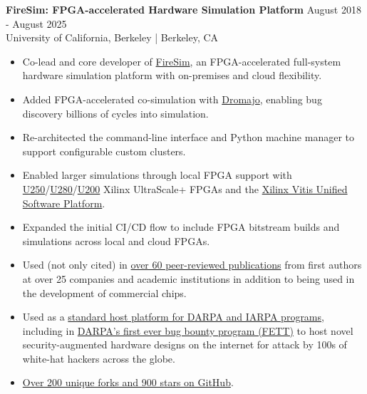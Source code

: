 \documentclass[line]{res}
\begin{document}
\begin{resume}
\label{sec:firesim}
\textbf{FireSim: FPGA-accelerated Hardware Simulation Platform} \hfill August 2018 - August 2025
\\
University of California, Berkeley | Berkeley, CA
\\
\vspace{-3mm}
\begin{itemize}
\item Co-lead and core developer of \href{https://fires.im/}{FireSim}, an FPGA-accelerated full-system hardware simulation platform with on-premises and cloud flexibility.
\item Added FPGA-accelerated co-simulation with \href{https://github.com/chipsalliance/dromajo}{Dromajo}, enabling bug discovery billions of cycles into simulation.
\item Re-architected the command-line interface and Python machine manager to support configurable custom clusters.
\item Enabled larger simulations through local FPGA support with \href{https://www.amd.com/en/products/accelerators/alveo/u250/a-u250-a64g-pq-g.html}{U250}/\href{https://docs.amd.com/r/en-US/ds963-u280}{U280}/\href{https://www.amd.com/en/products/accelerators/alveo/u200/a-u200-a64g-pq-g.html}{U200} Xilinx UltraScale+ FPGAs and the \href{https://www.amd.com/en/products/software/adaptive-socs-and-fpgas/vitis.html}{Xilinx Vitis Unified Software Platform}.
\item Expanded the initial CI/CD flow to include FPGA bitstream builds and simulations across local and cloud FPGAs.
\item Used (not only cited) in \href{https://fires.im/publications/#userpapers}{over 60 peer-reviewed publications} from first authors at over 25 companies and academic institutions in addition to being used in the development of commercial chips.
\item Used as a \href{https://fires.im/workshop-2023/}{standard host platform for DARPA and IARPA programs}, including in \href{https://fett.darpa.mil/}{DARPA's first ever bug bounty program (FETT)} to host novel security-augmented hardware designs on the internet for attack by 100s of white-hat hackers across the globe.
\item \href{https://github.com/firesim/firesim}{Over 200 unique forks and 900 stars on GitHub}.
\end{itemize}

\vspace{-2.4mm}

\newpage


\end{resume}
\end{document}
